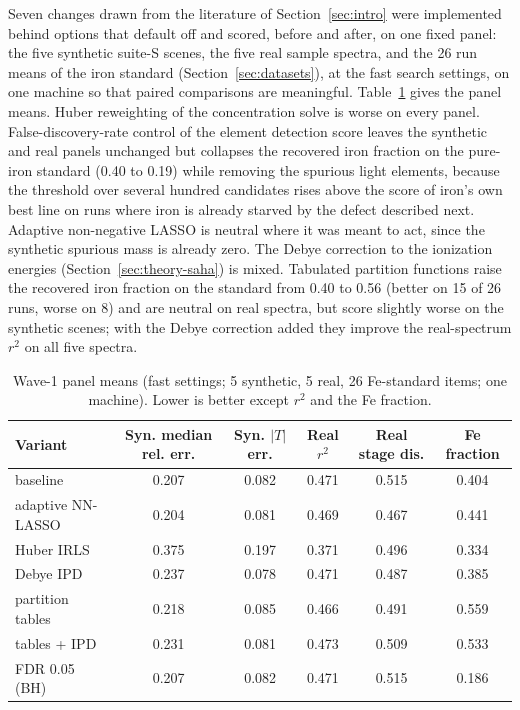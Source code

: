 Seven changes drawn from the literature of Section~\ref{sec:intro} were implemented behind
options that default off and scored, before and after, on one fixed panel: the five synthetic
suite-S scenes, the five real sample spectra, and the 26 run means of the iron standard
(Section~\ref{sec:datasets}), at the fast search settings, on one machine so that paired
comparisons are meaningful. %
Table~\ref{tab:ab} gives the panel means. Huber reweighting of the concentration solve
\citep{huber1964robust} is worse on every panel. False-discovery-rate control of the element
detection score \citep{benjamini1995fdr} leaves the synthetic and real panels unchanged but
collapses the recovered iron fraction on the pure-iron standard (0.40 to 0.19) while removing the
spurious light elements, because the threshold over several hundred candidates rises above the
score of iron's own best line on runs where iron is already starved by the defect described next.
Adaptive non-negative LASSO \citep{tibshirani1996lasso,zou2005elasticnet} is neutral where it was
meant to act, since the synthetic spurious mass is already zero. The Debye correction to the
ionization energies (Section~\ref{sec:theory-saha}) is mixed. Tabulated partition functions
\citep{barklem2016partition} raise the recovered iron fraction on the standard from 0.40 to 0.56
(better on 15 of 26 runs, worse on 8) and are neutral on real spectra, but score slightly worse on
the synthetic scenes; with the Debye correction added they improve the real-spectrum $r^2$ on all
five spectra. %

\begin{table}[t]
\centering
\footnotesize
\caption{Wave-1 panel means (fast settings; 5 synthetic, 5 real, 26 Fe-standard items; one machine).
Lower is better except $r^2$ and the Fe fraction. %
}
\label{tab:ab}
\begin{tabular}{@{}lccccc@{}}
\toprule
Variant & Syn. median rel. err. & Syn. $|T|$ err. & Real $r^2$ & Real stage dis. & Fe fraction \\
\midrule
baseline & 0.207 & 0.082 & 0.471 & 0.515 & 0.404 \\
adaptive NN-LASSO & 0.204 & 0.081 & 0.469 & 0.467 & 0.441 \\
Huber IRLS & 0.375 & 0.197 & 0.371 & 0.496 & 0.334 \\
Debye IPD & 0.237 & 0.078 & 0.471 & 0.487 & 0.385 \\
partition tables & 0.218 & 0.085 & 0.466 & 0.491 & 0.559 \\
tables + IPD & 0.231 & 0.081 & 0.473 & 0.509 & 0.533 \\
FDR 0.05 (BH) & 0.207 & 0.082 & 0.471 & 0.515 & 0.186 \\
\bottomrule
\end{tabular}
\end{table}

